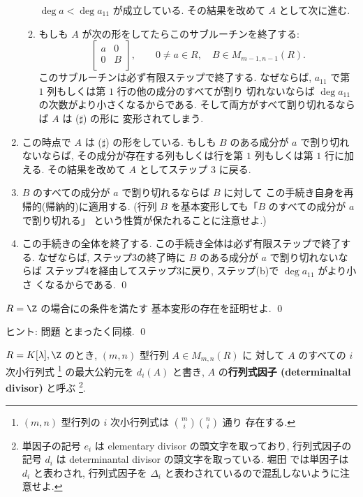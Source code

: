 \documentclass[12pt,twoside]{jarticle}
\begin{document}
\begin{enumerate}
\begin{enumerate}
    $\deg a<\deg a_{11}$ が成立している.
    その結果を改めて $A$ として次に進む.
  \item もしも $A$ が次の形をしてたらこのサブルーチンを終了する:
    \begin{equation*}
      \begin{bmatrix}
        a & 0 \\
        0 & B \\
      \end{bmatrix},
    \qquad
    0\ne a\in R,\quad
    B\in M_{m-1,n-1}(R).
    \tag{$\sharp$}
    \end{equation*}
    このサブルーチンは必ず有限ステップで終了する. 
    なぜならば, $a_{11}$ で第 $1$ 列もしくは第 $1$ 行の他の成分のすべてが割り
    切れないならば $\deg a_{11}$ の次数がより小さくなるからである.
    そして両方がすべて割り切れるならば $A$ は ($\sharp$) の形に
    変形されてしまう.
  \end{enumerate}
\item この時点で $A$ は ($\sharp$) の形をしている.  
  もしも $B$ のある成分が $a$ で割り切れないならば, 
  その成分が存在する列もしくは行を第 $1$ 列もしくは第 $1$ 行に加える.
  その結果を改めて $A$ としてステップ 3 に戻る.
\item $B$ のすべての成分が $a$ で割り切れるならば $B$ に対して
  この手続き自身を再帰的(帰納的)に適用する.  
  (行列 $B$ を基本変形しても「$B$ のすべての成分が $a$ で割り切れる」
  という性質が保たれることに注意せよ.)
\item この手続きの全体を終了する.
  この手続き全体は必ず有限ステップで終了する.
  なぜならば, ステップ3の終了時に $B$ のある成分が $a$ で割り切れないならば
  ステップ4を経由してステップ3に戻り, ステップ(b)で $\deg a_{11}$ がより小さ
  くなるからである.
  \qed
\end{enumerate}


\begin{question}
\label{q:exists-elementary-divisor-Z}
  $R=\Z$ の場合にの条件を満たす
  基本変形の存在を証明せよ. \qed
\end{question}

\noindent
ヒント: 問題  とまったく同様.
\qed

\medskip
\noindent

$R=K[\lambda],\Z$ のとき, $(m,n)$ 型行列 $A\in M_{m,n}(R)$ に
対して $A$ のすべての $i$ 次小行列式%
\footnote{$(m,n)$ 型行列の $i$ 次小行列式は $\binom{m}{i}\binom{n}{i}$ 通り
  存在する.}%
の最大公約元を $d_i(A)$ と書き, $A$ の{\bf 行列式因子 (determinaltal
divisor)} と呼ぶ%
\footnote{単因子の記号 $e_i$ は elementary divisor の頭文字を取っており,
  行列式因子の記号 $d_i$ は determinantal divisor の頭文字を取っている.
  堀田 \cite{gun-kagun} では単因子は $d_i$ と表わされ, 
  行列式因子を $\varDelta_i$ と表わされているので混乱しないように注意せよ.}.
\end{document}
